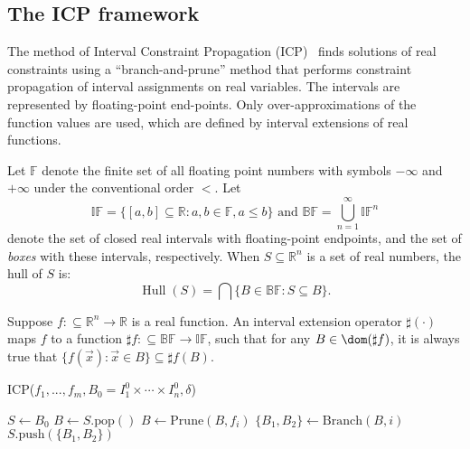 \documentclass[11pt]{article}
\DeclareMathOperator{\Hull}{Hull}
\begin{document}
\subsection{The ICP framework}

The method of Interval Constraint Propagation (ICP)~\cite{handbookICP} finds solutions of real constraints using a ``branch-and-prune'' method that performs constraint propagation of interval assignments on real variables. The intervals are represented by floating-point end-points. Only over-approximations of the function values are used, which are defined by interval extensions of real functions.
\begin{definition}
Let $\mathbb{F}$ denote the finite set of all floating point numbers with symbols $-\infty$ and $+\infty$ under the conventional order $<$. Let
$$\mathbb{IF} = \{[a,b]\subseteq \mathbb{R}: a,b\in \mathbb{F}, a\leq b\}\mbox{ and } \mathbb{BF} = \bigcup_{n=1}^{\infty}\mathbb{IF}^n$$ denote the set of closed real intervals with floating-point endpoints, and the set of {\em boxes} with these intervals, respectively. When $S\subseteq \mathbb{R}^n$ is a set of real numbers, the hull of $S$ is:
$$\Hull(S) = \bigcap \{B\in \mathbb{BF}: S\subseteq B\}.$$
\end{definition}
\begin{definition}
Suppose $f:\subseteq\mathbb{R}^n\rightarrow \mathbb{R}$ is a real function. An interval extension operator $\sharp(\cdot)$ maps $f$ to a function $\sharp f:\subseteq \mathbb{BF}\rightarrow \mathbb{IF}$, such that
for any $B\in \dom(\sharp f)$, it is always true that $\{f(\vec x):\vec x\in B\}\subseteq \sharp f(B).$
\end{definition}
\begin{algorithm}\label{algo1}
\caption{ICP($f_1,...,f_m, B_0 = I_1^0\times\cdots\times I_n^0, \delta$)}\label{icpalgo}
\begin{algorithmic}[1]
\Statex
    \State $S \gets B_0$
        \State $B \gets S.\mathrm{pop}()$
        \State $B \gets \mathrm{Prune}(B, f_i)$
        \EndWhile
                \State $\{B_1,B_2\} \gets \mathrm{Branch}(B, i)$
                \State $S.\mathrm{push}(\{B_1,B_2\})$
            \Else
                \State {}
            \EndIf
        \EndIf
    \EndWhile
    \State {}
\end{algorithmic}
\end{algorithm}
\end{document}

